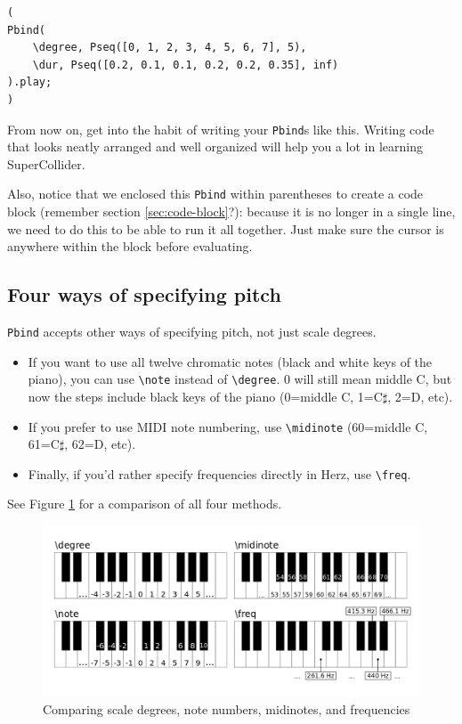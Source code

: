 \begin{lstlisting}[style=SuperCollider-IDE, basicstyle=\scttfamily\footnotesize]
(
Pbind(
	\degree, Pseq([0, 1, 2, 3, 4, 5, 6, 7], 5),
	\dur, Pseq([0.2, 0.1, 0.1, 0.2, 0.2, 0.35], inf)
).play;
)
\end{lstlisting}

From now on, get into the habit of writing your \texttt{Pbind}s like this. Writing code that looks neatly arranged and well organized will help you a lot in learning SuperCollider.

Also, notice that we enclosed this \texttt{Pbind} within parentheses to create a code block (remember section \ref{sec:code-block}?): because it is no longer in a single line, we need to do this to be able to run it all together. Just make sure the cursor is anywhere within the block before evaluating.


\subsection{Four ways of specifying pitch}

\texttt{Pbind} accepts other ways of specifying pitch, not just scale degrees.
\begin{itemize}
\item If you want to use all twelve chromatic notes (black and white keys of the piano), you can use \texttt{\textbackslash note} instead of \texttt{\textbackslash degree}. 0 will still mean middle C, but now the steps include black keys of the piano (0=middle C, 1=C$\sharp$, 2=D, etc).
\item  If you prefer to use MIDI note numbering, use \texttt{\textbackslash midinote} (60=middle C, 61=C$\sharp$, 62=D, etc).
\item Finally, if you'd rather specify frequencies directly in Herz, use \texttt{\textbackslash freq}.
\end{itemize}

See Figure \ref{fig:scale-degrees} for a comparison of all four methods.

\begin{figure}[h]
\centering
\includegraphics[scale=0.4]{fig-piano-keyboard-degree-note-midinote-freq.png}
\caption{Comparing scale degrees, note numbers, midinotes, and frequencies}
\label{fig:scale-degrees}
\end{figure}

